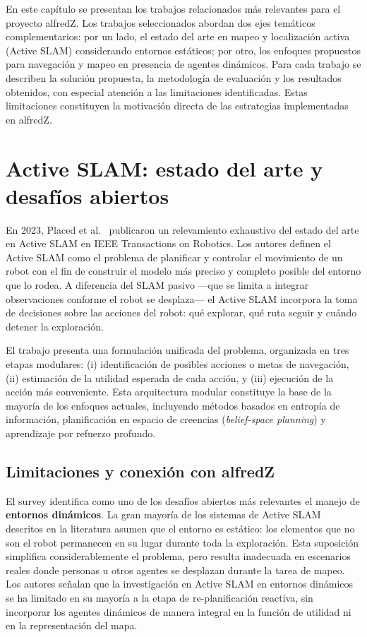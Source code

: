 En este capítulo se presentan los trabajos relacionados más relevantes para
el proyecto alfredZ. Los trabajos seleccionados abordan dos ejes temáticos
complementarios: por un lado, el estado del arte en mapeo y localización
activa (Active SLAM) considerando entornos estáticos; por otro, los enfoques
propuestos para navegación y mapeo en presencia de agentes dinámicos. Para
cada trabajo se describen la solución propuesta, la metodología de evaluación
y los resultados obtenidos, con especial atención a las limitaciones
identificadas. Estas limitaciones constituyen la motivación directa de las
estrategias implementadas en alfredZ.

\section{Active SLAM: estado del arte y desafíos abiertos}%

En 2023, Placed et al.~\cite{placed2023survey} publicaron un relevamiento
exhaustivo del estado del arte en Active SLAM en IEEE Transactions on
Robotics. Los autores definen el Active SLAM como el problema de planificar
y controlar el movimiento de un robot con el fin de construir el modelo más
preciso y completo posible del entorno que lo rodea. A diferencia del SLAM
pasivo ---que se limita a integrar observaciones conforme el robot se
desplaza--- el Active SLAM incorpora la toma de decisiones sobre las
acciones del robot: qué explorar, qué ruta seguir y cuándo detener la
exploración.

El trabajo presenta una formulación unificada del problema, organizada en
tres etapas modulares: (i) identificación de posibles acciones o metas de
navegación, (ii) estimación de la utilidad esperada de cada acción, y (iii)
ejecución de la acción más conveniente. Esta arquitectura modular constituye
la base de la mayoría de los enfoques actuales, incluyendo métodos basados
en entropía de información, planificación en espacio de creencias
(\textit{belief-space planning}) y aprendizaje por refuerzo profundo.

\subsection{Limitaciones y conexión con alfredZ}

El survey identifica como uno de los desafíos abiertos más relevantes el
manejo de \textbf{entornos dinámicos}. La gran mayoría de los sistemas de
Active SLAM descritos en la literatura asumen que el entorno es estático:
los elementos que no son el robot permanecen en su lugar durante toda la
exploración. Esta suposición simplifica considerablemente el problema, pero
resulta inadecuada en escenarios reales donde personas u otros agentes se
desplazan durante la tarea de mapeo. Los autores señalan que la
investigación en Active SLAM en entornos dinámicos se ha limitado en su
mayoría a la etapa de re-planificación reactiva, sin incorporar los agentes
dinámicos de manera integral en la función de utilidad ni en la
representación del mapa.


